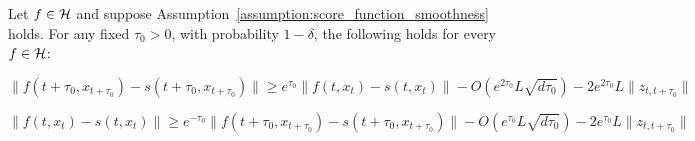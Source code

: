 




\begin{lemma}\label{lemma:function_time_regularity}
Let $f \in \mathcal{H}$ and suppose Assumption~\ref{assumption:score_function_smoothness} holds. For any fixed $\tau_0 > 0$, with probability $1-\delta$, the following holds for every $f \in \mathcal{H}$:

 $$\|f(t+\tau_0,x_{t+\tau_0})-s(t+\tau_0,x_{t+\tau_0})\| \geq e^{\tau_0}\|f(t,x_t)-s(t,x_t)\| - O(e^{2\tau_0}L\sqrt{d\tau_0}) - 2e^{2\tau_0}L\|z_{t,t+\tau_0}\|$$

  $$\|f(t,x_t)-s(t,x_t)\|  \geq e^{-\tau_0}\|f(t+\tau_0,x_{t+\tau_0})-s(t+\tau_0,x_{t+\tau_0})\|  - O(e^{\tau_0}L\sqrt{d\tau_0}) - 2e^{\tau_0}L\|z_{t,t+\tau_0}\|$$
\end{lemma}

